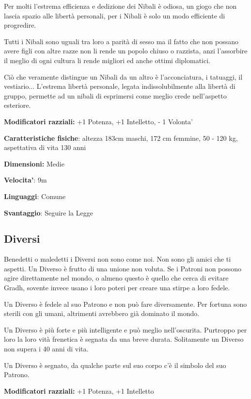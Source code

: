 \documentclass[a4paper,11pt,twoside,openany]{book}
\begin{document}
Per molti l'estrema efficienza e dedizione dei Nibali è odiosa, un giogo che non lascia spazio alle libertà personali, per i Nibali è solo un modo efficiente di progredire.

Tutti i Nibali sono uguali tra loro a parità di sesso ma il fatto che non possano avere figli con altre razze non li rende un popolo chiuso o razzista, anzi l'assorbire il meglio di ogni cultura li rende migliori ed anche ottimi diplomatici.

Ciò che veramente distingue un Nibali da un altro è l'acconciatura, i tatuaggi, il vestiario... L'estrema libertà personale, legata indissolubilmente alla libertà di gruppo, permette ad un nibali di esprimersi come meglio crede nell'aspetto esteriore.

\textbf{Modificatori razziali:} +1 Potenza, +1 Intelletto, - 1 Volonta'

\textbf{Caratteristiche fisiche}: altezza 183cm maschi, 172 cm femmine, 50 - 120 kg, aspettativa di vita 130 anni

\textbf{Dimensioni:} Medie

\textbf{Velocita'}: 9m

\textbf{Linguaggi}: Comune

\textbf{Svantaggio}: Seguire la Legge

\subsection{Diversi}

\label{diversi}

Benedetti o maledetti i Diversi non sono come noi. Non sono gli amici che ti aspetti. Un Diverso è frutto di una unione non voluta. Se i Patroni non possono agire direttamente nel mondo, o almeno questo è quello che cerca di evitare Gradh, sovente invece usano i loro poteri per creare una stirpe a loro fedele.

Un Diverso è fedele al suo Patrono e non può fare diversamente. Per fortuna sono sterili con gli umani, altrimenti avrebbero già dominato il mondo.

Un Diverso è più forte e più intelligente e può meglio nell'oscurita. Purtroppo per loro la loro vità frenetica è segnata da una breve durata. Solitamente un Diverso non supera i 40 anni di vita.

Un Diverso è segnato, da qualche parte sul suo corpo c'è il simbolo del suo Patrono.

\textbf{Modificatori razziali:} +1 Potenza, +1 Intelletto
\end{document}
